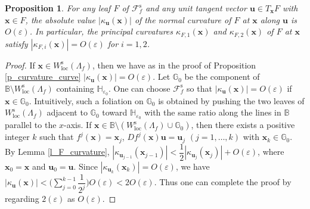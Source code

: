 \documentclass{amsart}
\newtheorem{prop}[thm]{Proposition}
\theoremstyle{definition}
\numberwithin{equation}{section}
\numberwithin{figure}{section}
\begin{document}
\begin{prop}\label{p_curvature_plane}
For any leaf $F$ of $\mathcal{F}_f^{\mathrm{s}}$ and any unit tangent vector $\boldsymbol{u}\in T_{\boldsymbol{x}} F$ 
with $\boldsymbol{x}\in F$, 
the absolute value $|\kappa_{\boldsymbol{u}}(\boldsymbol{x})|$ of the normal curvature of $F$ at $\boldsymbol{x}$ along $\boldsymbol{u}$ is $O(\varepsilon)$.
In particular, the principal curvatures $\kappa_{F,1}(\boldsymbol{x})$ and $\kappa_{F,2}(\boldsymbol{x})$ of $F$ at $\boldsymbol{x}$ 
satisfy $|\kappa_{F,i}(\boldsymbol{x})|=O(\varepsilon)$ for $i=1,2$.
\end{prop}
\begin{proof}
If $\boldsymbol{x}\in W_{\mathrm{loc}}^{\mathrm{s}}(\Lambda_f)$, then we have as in the proof of 
Proposition \ref{p_curvature_curve} $|\kappa_{\boldsymbol{u}}(\boldsymbol{x})|=O(\varepsilon)$.
Let $\mathbb{G}_0$ be the component of $\mathbb{B}\setminus W_{\mathrm{loc}}^{\mathrm{s}}(\Lambda_f)$ 
containing $\mathbb{H}_{\varepsilon_0}$.
One can choose $\mathcal{F}_f^{\mathrm{s}}$ so that $|\kappa_{\boldsymbol{u}}(\boldsymbol{x})|
=O(\varepsilon)$ 
if $\boldsymbol{x}\in \mathbb{G}_0$.
Intuitively, such a foliation on $\mathbb{G}_0$ is obtained by pushing the two leaves of $W_{\mathrm{loc}}^{\mathrm{s}}(\Lambda_f)$ adjacent to $\mathbb{G}_0$ toward $\mathbb{H}_{\varepsilon_0}$ 
with the same ratio 
along the lines in $\mathbb{B}$ parallel to the $x$-axis.
If $\boldsymbol{x}\in \mathbb{B}\setminus (W_{\mathrm{loc}}^{\mathrm{s}}(\Lambda_f)\cup \mathbb{G}_0)$, 
then there exists a positive integer $k$ such that 
$f^j(\boldsymbol{x})=\boldsymbol{x}_{j}$, $Df^j(\boldsymbol{x})\boldsymbol{u}=\boldsymbol{u}_{j}$ $(j=1,\dots,k)$ with $\boldsymbol{x}_k\in \mathbb{G}_0$.
By Lemma \ref{l_F_curvature}, $|\kappa_{\boldsymbol{u}_{j-1}}(\boldsymbol{x}_{j-1})|<\dfrac12 |\kappa_{\boldsymbol{u}_{j}}(\boldsymbol{x}_{j})|+O(\varepsilon)$, 
where $\boldsymbol{x}_0=\boldsymbol{x}$ and $\boldsymbol{u}_0=\boldsymbol{u}$.
Since $|\kappa_{\boldsymbol{u}_k}(\boldsymbol{x}_k)|=O(\varepsilon)$, 
we have 
$|\kappa_{\boldsymbol{u}}(\boldsymbol{x})|<\biggl(\sum\limits_{j=0}^{k-1}\dfrac1{2^j}\biggr)O(\varepsilon)<2O(\varepsilon).$
Thus one can complete the proof by regarding $2(\varepsilon)$ as $O(\varepsilon)$.
\end{proof}
\end{document}
